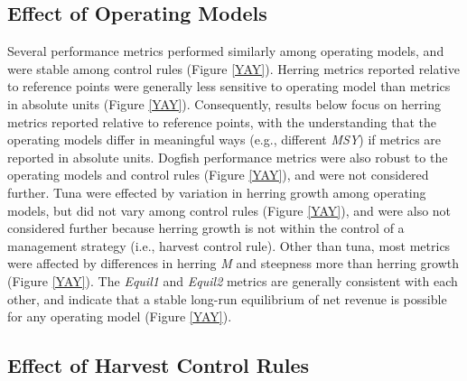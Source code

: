 \documentclass[]{article}
\begin{document}
\subsection{Effect of Operating
Models}\label{effect-of-operating-models}

Several performance metrics performed similarly among operating models,
and were stable among control rules (Figure \ref{YAY}). Herring metrics
reported relative to reference points were generally less sensitive to
operating model than metrics in absolute units (Figure \ref{YAY}).
Consequently, results below focus on herring metrics reported relative
to reference points, with the understanding that the operating models
differ in meaningful ways (e.g., different \emph{MSY}) if metrics are
reported in absolute units. Dogfish performance metrics were also robust
to the operating models and control rules (Figure \ref{YAY}), and were
not considered further. Tuna were effected by variation in herring
growth among operating models, but did not vary among control rules
(Figure \ref{YAY}), and were also not considered further because herring
growth is not within the control of a management strategy (i.e., harvest
control rule). Other than tuna, most metrics were affected by
differences in herring \emph{M} and steepness more than herring growth
(Figure \ref{YAY}). The \emph{Equil1} and \emph{Equil2} metrics are
generally consistent with each other, and indicate that a stable
long-run equilibrium of net revenue is possible for any operating model
(Figure \ref{YAY}).

\subsection{Effect of Harvest Control
Rules}\label{effect-of-harvest-control-rules}
\end{document}
